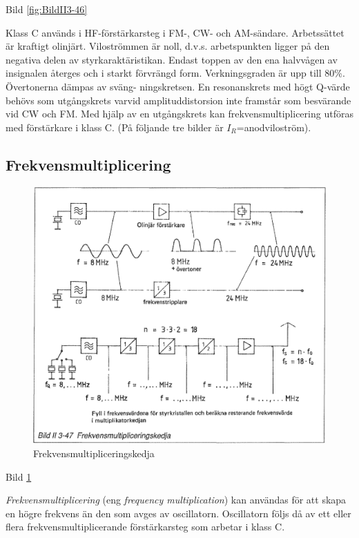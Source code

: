 Bild \ref{fig:BildII3-46}

Klass C används i HF-förstärkarsteg i FM-, CW- och
AM-sändare. Arbetssättet är kraftigt olinjärt. Viloströmmen är noll,
d.v.s. arbetspunkten ligger på den negativa delen av
styrkaraktäristikan. Endast toppen av den ena halvvågen av insignalen
återges och i starkt förvrängd form. Verkningsgraden är upp till
80\%. Övertonerna dämpas av sväng- ningskretsen. En resonanskrets med
högt Q-värde behövs som utgångskrets varvid amplituddistorsion inte
framstår som besvärande vid CW och FM. Med hjälp av en utgångskrets
kan frekvensmultiplicering utföras med förstärkare i klass C.  (På
följande tre bilder är \(I_R\)=anodviloström).

\subsection{Frekvensmultiplicering}

\begin{figure}
\includegraphics[width=\textwidth]{images/bild_2_3-47}
\caption{Frekvensmultipliceringskedja}
\label{fig:BildII3-47}
\end{figure}

Bild \ref{fig:BildII3-47}

\emph{Frekvensmultiplicering} (eng \emph{frequency multiplication}) kan
användas för att skapa en högre frekvens än den som avges av oscillatorn.
Oscillatorn följs då av ett eller flera frekvensmultiplicerande förstärkarsteg
som arbetar i klass C.

